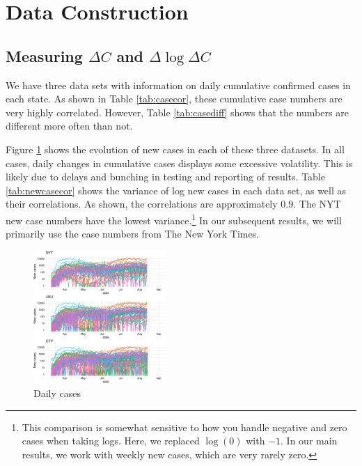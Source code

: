 \documentclass[11pt,reqno,letter]{amsart}
\theoremstyle{definition}
\begin{document}
\FloatBarrier

\begin{footnotesize}




\end{footnotesize}


\newpage

\appendix

\section{Data Construction}


\subsection{Measuring $\Delta C$ and $\Delta\log \Delta C$}

We have three data sets with information on daily cumulative confirmed
cases in each state. As shown in Table \ref{tab:casecor}, these
cumulative case numbers are very highly correlated. However, Table
\ref{tab:casediff} shows that the numbers are different more often
than not.





Figure \ref{fig:dailycases} shows the evolution of new cases in each
of these three datasets. In all cases, daily changes in cumulative
cases displays some excessive volatility. This is likely due to delays
and bunching in testing and reporting of results. Table
\ref{tab:newcasecor} shows the variance of log new cases in each data
set, as well as their correlations. As shown, the correlations are
approximately $0.9$. The NYT new case
numbers have the lowest variance.\footnote{This comparison is somewhat
  sensitive to how you handle negative and zero cases when taking
  logs. Here, we replaced $\log(0)$ with $-1$. In our main
  results, we work with weekly new cases, which are very rarely zero.}
In our subsequent results, we will primarily use the case numbers from
The New York Times.

\begin{figure}[!ht]\caption{Daily cases \label{fig:dailycases}}
  \centering
  \begin{minipage}{\textwidth}
    \centering
    \includegraphics[width=0.45\textwidth]{tables_and_figures/newcases}
  \end{minipage}
\end{figure}
\end{document}
